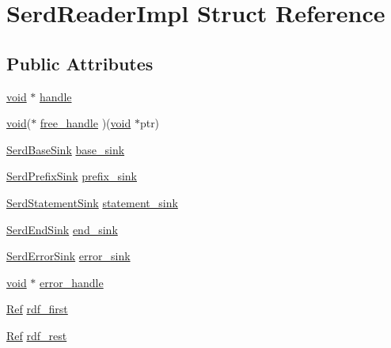 \hypertarget{struct_serd_reader_impl}{}\section{Serd\+Reader\+Impl Struct Reference}
\label{struct_serd_reader_impl}
\subsection*{Public Attributes}
\begin{DoxyCompactItemize}
\item 
\hyperlink{sound_8c_ae35f5844602719cf66324f4de2a658b3}{void} $\ast$ \hyperlink{struct_serd_reader_impl_a28b79e692482b0d851fa270cebecc82d}{handle}
\item 
\hyperlink{sound_8c_ae35f5844602719cf66324f4de2a658b3}{void}($\ast$ \hyperlink{struct_serd_reader_impl_a191c6250ae91cb188e174c620e2a56a4}{free\+\_\+handle} )(\hyperlink{sound_8c_ae35f5844602719cf66324f4de2a658b3}{void} $\ast$ptr)
\item 
\hyperlink{group__serd_ga9f1652e78562130337b519f309dd5125}{Serd\+Base\+Sink} \hyperlink{struct_serd_reader_impl_af5714ae0f9634efefffe98c4f3bb71bb}{base\+\_\+sink}
\item 
\hyperlink{group__serd_ga692f0bbdf5e2576191ee3556ecde7d55}{Serd\+Prefix\+Sink} \hyperlink{struct_serd_reader_impl_a211a08bf052bba443d0ade936dac6e14}{prefix\+\_\+sink}
\item 
\hyperlink{group__serd_ga9cd6dc709f738ed9770d0d2cd1195bd4}{Serd\+Statement\+Sink} \hyperlink{struct_serd_reader_impl_aca8f39fb5b4a86cb32a716c00d6c4b35}{statement\+\_\+sink}
\item 
\hyperlink{group__serd_gae67888543462e4127e6a4f6af047026b}{Serd\+End\+Sink} \hyperlink{struct_serd_reader_impl_aec86fe1b35ee482731a7b9777d2d6d58}{end\+\_\+sink}
\item 
\hyperlink{group__serd_ga925d2fda236697a3e643b307ffe242e5}{Serd\+Error\+Sink} \hyperlink{struct_serd_reader_impl_a2b58643d49634d56a1a9f415af3ee4ad}{error\+\_\+sink}
\item 
\hyperlink{sound_8c_ae35f5844602719cf66324f4de2a658b3}{void} $\ast$ \hyperlink{struct_serd_reader_impl_a71c2449acdc262672cebdae6ea4c714d}{error\+\_\+handle}
\item 
\hyperlink{reader_8c_ae3e9b21450ad93b7e7f8e5be89e2d8db}{Ref} \hyperlink{struct_serd_reader_impl_a113ee2dfd936366f9c714ed70020520d}{rdf\+\_\+first}
\item 
\hyperlink{reader_8c_ae3e9b21450ad93b7e7f8e5be89e2d8db}{Ref} \hyperlink{struct_serd_reader_impl_a32af449a191e755cb1127c3508f2b430}{rdf\+\_\+rest}

\end{DoxyCompactItemize}
